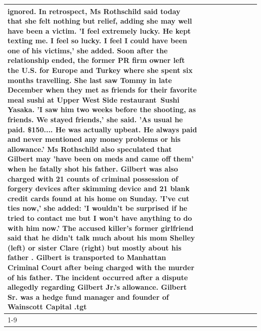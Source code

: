 \begin{table}[H]
\begin{tabular}{lllrlllll}
ignored. In retrospect, Ms Rothschild said today that she felt nothing but relief, adding she may well have been a victim. 'I feel extremely lucky. He kept texting me. I feel so lucky. I feel I could have been one of his victims,' she added. Soon after the relationship ended, the former PR firm owner left the U.S. for Europe and Turkey where she spent six months  travelling. She last saw Tommy in late December when they met as friends for their favorite meal sushi at Upper West Side restaurant Sushi Yasaka. 'I saw him two weeks before the shooting, as friends. We stayed friends,' she said. 'As usual he paid. \$150.... He was actually upbeat. He always paid and never mentioned any money problems or his allowance.' Ms Rothschild also speculated that Gilbert may 'have been on meds and came off them' when he fatally shot his father. Gilbert was also charged with 21 counts of criminal possession of forgery devices after skimming device and 21 blank credit cards found at his home on Sunday. 'I've cut ties now,' she added: 'I wouldn’t be surprised if he tried to contact me but I won’t have anything to do with him now.' The accused killer's former girlfriend said that he didn't talk much about his mom Shelley (left) or sister Clare (right) but mostly about his father . Gilbert is transported to Manhattan Criminal Court  after being charged with the murder of his father. The incident occurred after a dispute allegedly regarding Gilbert Jr.'s allowance. Gilbert Sr. was a hedge fund manager and founder of Wainscott Capital .tgt \\
\cline{1-9}

\end{tabular}
\end{table}
